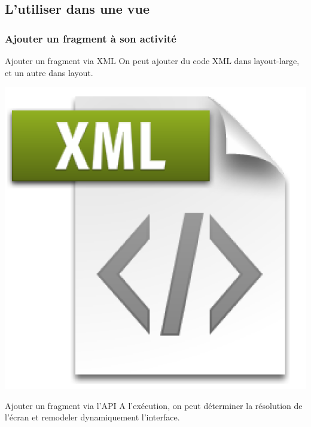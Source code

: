 \documentclass{beamer}
\begin{document}
\subsection{L'utiliser dans une vue}

\begin{frame}
\frametitle{Ajouter un fragment à son activité}
\begin{block}{Ajouter un fragment via XML}
On peut ajouter du code XML dans layout-large, et un autre dans layout.
\end{block}
\begin{center}
\includegraphics[scale=0.05]{xml-file.png}
\end{center}
\begin{block}{Ajouter un fragment via l'API}
A l'exécution, on peut déterminer la résolution de l'écran et remodeler dynamiquement l'interface.
\end{block}
\begin{center}

\end{center}
\end{frame}
\end{document}
